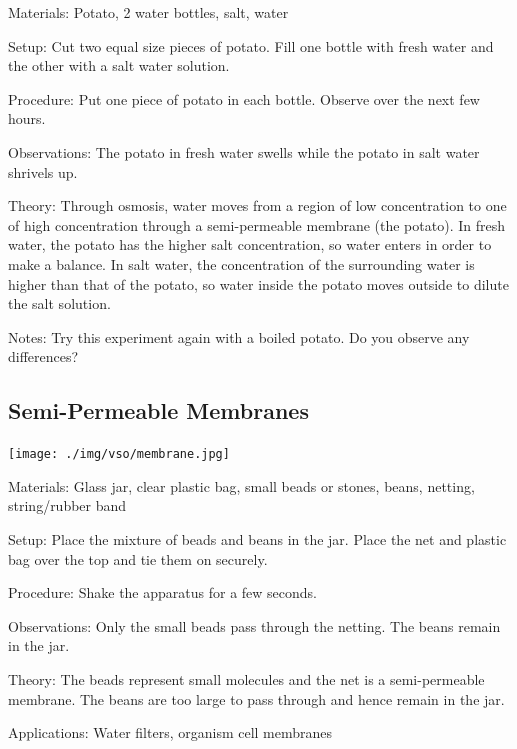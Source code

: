 \begin{multicols}{2}
\begin{description*}
\item[Materials:]{Potato, 2 water bottles, salt, water}
\item[Setup:]{Cut two equal size pieces of potato. Fill one bottle with fresh water and the other with a salt water solution.}
\item[Procedure:]{Put one piece of potato in each bottle. Observe over the next few hours.}
\item[Observations:]{The potato in fresh water swells while the potato in salt water shrivels up.}
\item[Theory:]{Through osmosis, water moves from a region of low concentration to one of high concentration through a semi-permeable membrane (the potato). In fresh water, the potato has the higher salt concentration, so water enters in order to make a balance. In salt water, the concentration of the surrounding water is higher than that of the potato, so water inside the potato moves outside to dilute the salt solution.}
\item[Notes:]{Try this experiment again with a boiled potato. Do you observe any differences?}
\end{description*}

\columnbreak

\subsection{Semi-Permeable Membranes}

\begin{center}
\texttt{[image: ./img/vso/membrane.jpg]}
\end{center}

\begin{description*}
\item[Materials:]{Glass jar, clear plastic bag, small beads or stones, beans, netting, string/rubber band}
\item[Setup:]{Place the mixture of beads and beans in the jar. Place the net and plastic bag over the top and tie them on securely.}
\item[Procedure:]{Shake the apparatus for a few seconds.}
\item[Observations:]{Only the small beads pass through the netting. The beans remain in the jar.}
\item[Theory:]{The beads represent small molecules and the net is a semi-permeable membrane. The beans are too large to pass through and hence remain in the jar.}
\item[Applications:]{Water filters, organism cell membranes}
\end{description*}


\end{multicols}
